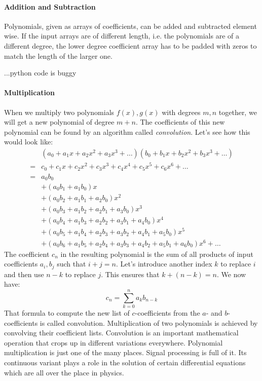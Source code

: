 \paragraph{Addition and Subtraction}
Polynomials, given as arrays of coefficients, can be added and subtracted element wise. If the input arrays are of different length, i.e. the polynomials are of a different degree, the lower degree coefficient array has to be padded with zeros to match the length of the larger one.

...python code is buggy

\paragraph{Multiplication}
When we multiply two polynomials $f(x), g(x)$ with degrees $m,n$ together, we will get a new polynomial of degree $m+n$. The coefficients of this new polynomial can be found by an algorithm called \emph{convolution}. Let's see how this would look like:
\begin{eqnarray}
&  (a_0 + a_1 x + a_2 x^2 + a_3 x^3 + \ldots)
   (b_0 + b_1 x + b_2 x^2 + b_3 x^3 + \ldots)  \\
=&  c_0 + c_1 x + c_2 x^2 + c_3 x^3 + c_4 x^4 + c_5 x^5 + c_6 x^6 + \ldots \\
=&  a_0 b_0 \\
&+ (a_0 b_1 + a_1 b_0) x \\
&+ (a_0 b_2 + a_1 b_1 + a_2 b_0) x^2 \\
&+ (a_0 b_3 + a_1 b_2 + a_2 b_1 + a_3 b_0) x^3  \\
&+ (a_0 b_4 + a_1 b_3 + a_2 b_2 + a_3 b_1 + a_4 b_0) x^4 \\
&+ (a_0 b_5 + a_1 b_4 + a_2 b_3 + a_3 b_2 + a_4 b_1 + a_5 b_0) x^5 \\
&+ (a_0 b_6 + a_1 b_5 + a_2 b_4 + a_3 b_3 + a_4 b_2 + a_5 b_1 + a_6 b_0) x^6 + \ldots
\end{eqnarray}
The coefficient $c_n$ in the resulting polynomial is the sum of all products of input coefficients $a_i, b_j$ such that $i+j = n$. Let's introduce another index $k$ to replace $i$ and then use $n-k$ to replace $j$. This ensures that $k + (n-k) = n$. We now have:
\begin{equation}
  c_n = \sum_{k=0}^n a_k b_{n-k}
\end{equation}
That formula to compute the new list of $c$-coefficients from the $a$- and $b$-coefficients is called convolution. Multiplication of two polynomials is achieved by convolving their coefficient lists. Convolution is an important mathematical operation that crops up in different variations everywhere. Polynomial multiplication is just one of the many places. Signal processing is full of it. Its continuous variant plays a role in the solution of certain differential equations which are all over the place in physics.

